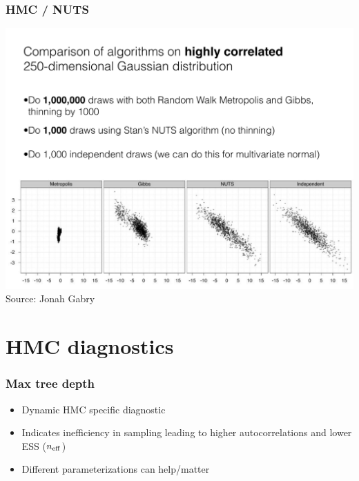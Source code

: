 \documentclass[10pt]{beamer}
\begin{document}
\begin{frame}

\frametitle{HMC / NUTS}

  \vspace{-.5\baselineskip}
  \includegraphics[width=\textwidth,clip]{figs/N250.pdf}\\
  Source: Jonah Gabry

\end{frame}

\section{HMC diagnostics}
\frame{\sectionpage}

\begin{frame}

\frametitle{Max tree depth}

  \begin{itemize}
  \item Dynamic HMC specific diagnostic
  \item Indicates inefficiency in sampling leading to higher
    autocorrelations and lower ESS ($n_{\rm eff}$)
  \item Different parameterizations can help/matter
  \end{itemize}
\end{frame}
\end{document}
